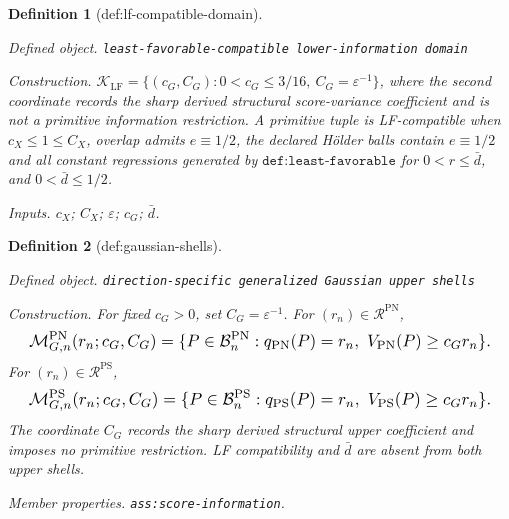 \documentclass{article}
\newtheorem{definition}{Definition}
\begin{document}
\begin{definition}[def:lf-compatible-domain]\label{def:lf-compatible-domain}
\par\smallskip\noindent\emph{Defined object.} \texttt{least-\allowbreak{}favorable-\allowbreak{}compatible lower-\allowbreak{}information domain}
\par\smallskip\noindent\emph{Construction.} \(\mathcal K_{\mathrm{LF}}=\{(c_G,C_G):0<c_G\le3/16,\ C_G=\varepsilon^{-1}\}\), where the second coordinate records the sharp derived structural score-variance coefficient and is not a primitive information restriction. A primitive tuple is LF-compatible when \(c_X\le1\le C_X\), overlap admits \(e\equiv1/2\), the declared H\"older balls contain \(e\equiv1/2\) and all constant regressions generated by \(\texttt{def:least-favorable}\) for \(0<r\le\bar d\), and \(0<\bar d\le1/2\).
\par\smallskip\noindent\emph{Inputs.} \(c_X\); \(C_X\); \(\varepsilon\); \(c_G\); \(\bar d\).
\end{definition}

\begin{definition}[def:gaussian-shells]\label{def:gaussian-shells}
\par\smallskip\noindent\emph{Defined object.} \texttt{direction-\allowbreak{}specific generalized Gaussian upper shells}
\par\smallskip\noindent\emph{Construction.} For fixed \(c_G>0\), set \(C_G=\varepsilon^{-1}\). For \((r_n)\in\mathcal R^{\mathrm{PN}}\),
\[
\makebox[\linewidth][c]{\resizebox{0.98\linewidth}{!}{\par\noindent \makebox[\linewidth][c]{\resizebox{0.98\linewidth}{!}{\(\displaystyle \displaystyle \mathcal M_{G,n}^{\mathrm{PN}}(r_n;c_G,C_G)=\{P\in\mathcal B_n^{\mathrm{PN}}:q_{\mathrm{PN}}(P)=r_n,\ V_{\mathrm{PN}}(P)\ge c_Gr_n\}.\)}}\par\noindent}}
\]
For \((r_n)\in\mathcal R^{\mathrm{PS}}\),
\[
\makebox[\linewidth][c]{\resizebox{0.98\linewidth}{!}{\par\noindent \makebox[\linewidth][c]{\resizebox{0.98\linewidth}{!}{\(\displaystyle \displaystyle \mathcal M_{G,n}^{\mathrm{PS}}(r_n;c_G,C_G)=\{P\in\mathcal B_n^{\mathrm{PS}}:q_{\mathrm{PS}}(P)=r_n,\ V_{\mathrm{PS}}(P)\ge c_Gr_n\}.\)}}\par\noindent}}
\]
The coordinate \(C_G\) records the sharp derived structural upper coefficient and imposes no primitive restriction. LF compatibility and \(\bar d\) are absent from both upper shells.
\par\smallskip\noindent\emph{Member properties.} \texttt{ass:\allowbreak{}score-\allowbreak{}information}.
\end{definition}
\end{document}
